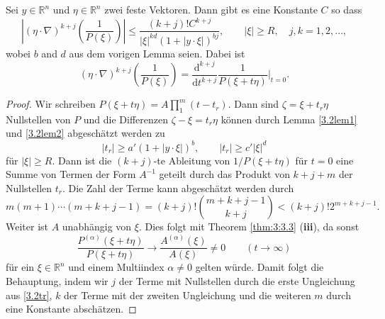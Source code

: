 \begin{lem}\label{3.2lem3}
Sei $y\in \mathbb R^n$ und $\eta \in \mathbb R^n$ zwei feste Vektoren. Dann gibt es eine Konstante $C$ so dass
\begin{equation}
\left |(\eta\cdot\nabla)^{k+j} \left ( \frac{1}{P(\xi)} \right )  \right | \le \frac{(k+j)! C^{k+j}}{|\xi|^{kd} ( 1+ | y\cdot\xi | )^{bj}},\qquad  |\xi|\ge R, \quad j, k=1,2,\ldots,
\end{equation}
wobei $b$ and $d$ aus dem vorigen Lemma seien. Dabei ist
\begin{equation}
(\eta\cdot\nabla)^{k+j} \left (\frac{1}{P(\xi)} \right ) =  \frac{\mathrm d^{k+j}}{\mathrm d t^{k+j}}  \frac{1}{P(\xi+ t\eta)} \bigg|_{t=0}.
\end{equation}
\end{lem}
\begin{proof}
Wir schreiben $P(\xi+t\eta) = A \prod_{1}^m (t-t_r) $. Dann sind $\zeta = \xi+ t_r \eta$ Nullstellen von $P$ und die Differenzen $\zeta - \xi = t_r \eta$ können 
durch Lemma \ref{3.2lem1} und \ref{3.2lem2} abgeschätzt werden zu
\begin{equation}\label{3.2tr}
|t_r| \ge a' (1+| y\cdot  \xi |)^b,\qquad |t_r|\ge c' |\xi|^d
\end{equation}
für $|\xi|\ge R$. Dann ist die $(k+j)$-te  Ableitung von $1/P(\xi+t\eta)$ für $t=0$ eine Summe von Termen der Form $A^{-1}$ geteilt durch das Produkt von $k+j+m$ der Nullstellen $t_r$. Die Zahl der Terme kann abgeschätzt werden durch
\begin{equation}
m(m+1) \cdots (m+k+j-1) =(k+j)! \binom{m+k+j-1}{k+j}<(k+j)! 2^{m+k+j-1}.
\end{equation}
Weiter ist $A$ unabhängig von $\xi$. Dies folgt mit Theorem \ref{thm:3:3.3} ({\bf iii}), da sonst
\begin{equation}
\frac{P^{(\alpha)}(\xi + t\eta)}{P(\xi + t\eta)}\to \frac{A^{(\alpha)}(\xi)}{A(\xi)}\neq 0\qquad(t\to \infty)
\end{equation}
für ein $\xi\in \mathbb R^n$ und einem Multiindex $\alpha\neq 0$ gelten würde.
Damit folgt die Behauptung, indem wir $j$ der Terme mit Nullstellen durch die erste Ungleichung aus \eqref{3.2tr}, $k$ der Terme mit der zweiten Ungleichung und die weiteren $m$ durch eine Konstante abschätzen.  
\end{proof}


